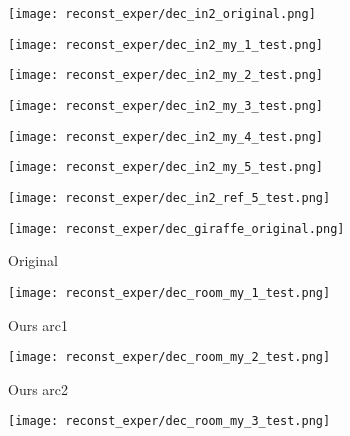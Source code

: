 \begin{figure}[H]
	\centering
	\begin{subfigure}[b]{0.13\linewidth}
		\texttt{[image: reconst\_exper/dec\_in2\_original.png]} %
	\end{subfigure}
	\begin{subfigure}[b]{0.13\linewidth}
		\texttt{[image: reconst\_exper/dec\_in2\_my\_1\_test.png]} %
	\end{subfigure}
	\begin{subfigure}[b]{0.13\linewidth}
		\texttt{[image: reconst\_exper/dec\_in2\_my\_2\_test.png]} %
	\end{subfigure}
	\begin{subfigure}[b]{0.13\linewidth}
		\texttt{[image: reconst\_exper/dec\_in2\_my\_3\_test.png]} %
	\end{subfigure}
	\begin{subfigure}[b]{0.13\linewidth}
		\texttt{[image: reconst\_exper/dec\_in2\_my\_4\_test.png]} %
	\end{subfigure}
	\begin{subfigure}[b]{0.13\linewidth}
		\texttt{[image: reconst\_exper/dec\_in2\_my\_5\_test.png]} %
	\end{subfigure}
	\begin{subfigure}[b]{0.13\linewidth}
		\texttt{[image: reconst\_exper/dec\_in2\_ref\_5\_test.png]} %
	\end{subfigure}
	\centering
	\begin{subfigure}[b]{0.13\linewidth}
		\texttt{[image: reconst\_exper/dec\_giraffe\_original.png]} %
		\caption{Original}
	\end{subfigure}
	\begin{subfigure}[b]{0.13\linewidth}
		\texttt{[image: reconst\_exper/dec\_room\_my\_1\_test.png]} %
		\caption{Ours arc1}
	\end{subfigure}
	\begin{subfigure}[b]{0.13\linewidth}
		\texttt{[image: reconst\_exper/dec\_room\_my\_2\_test.png]} %
		\caption{Ours arc2}
	\end{subfigure}
	\begin{subfigure}[b]{0.13\linewidth}
		\texttt{[image: reconst\_exper/dec\_room\_my\_3\_test.png]} %

\end{subfigure}
\end{figure}
